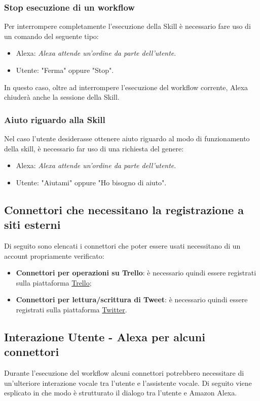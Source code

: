 \subsubsection{Stop esecuzione di un workflow}
Per interrompere completamente l'esecuzione della Skill è necessario fare uso di un comando del seguente tipo:
\begin{itemize}
	\item Alexa: \textit{Alexa attende un'ordine da parte dell'utente}.
	\item Utente: "Ferma" oppure "Stop".
\end{itemize}
In questo caso, oltre ad interrompere l'esecuzione del workflow corrente, Alexa chiuderà anche la sessione della Skill.
\subsubsection{Aiuto riguardo alla Skill}
Nel caso l'utente desiderasse ottenere aiuto riguardo al modo di funzionamento della skill, è necessario far uso di una richiesta del genere:
\begin{itemize}
	\item Alexa: \textit{Alexa attende un'ordine da parte dell'utente}.
	\item Utente: "Aiutami" oppure "Ho bisogno di aiuto".
\end{itemize}

\subsection{Connettori che necessitano la registrazione a siti esterni}
Di seguito sono elencati i connettori che poter essere usati necessitano di un account propriamente verificato:
\begin{itemize}
	\item \textbf{Connettori per operazioni su Trello}: è necessario quindi essere registrati sulla piattaforma \href{https://trello.com}{Trello};
	\item \textbf{Connettori per lettura/scrittura di Tweet}: è necessario quindi essere registrati sulla piattaforma \href{https://twitter.com/}{Twitter}.
\end{itemize}


\subsection{Interazione Utente - Alexa per alcuni connettori}
Durante l’esecuzione del workflow alcuni connettori potrebbero necessitare di un’ulteriore
interazione vocale tra l’utente e l’assistente vocale. Di seguito viene esplicato in che modo
è strutturato il dialogo tra l’utente e Amazon Alexa.
